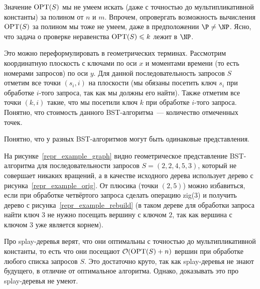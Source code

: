 Значение $\operatorname{OPT}(S)$ мы не умеем искать (даже с точностью до мультипликативной константы) за полином от $n$ и $m$.
Впрочем, опровергать возможность вычисления $\operatorname{OPT}(S)$
за полином мы тоже не умеем, даже в предположении $\P \neq \NP$. Ясно,
что задача о проверке неравенства $\operatorname{OPT}(S) \leqslant k$ лежит в $\NP$.

Это можно переформулировать в геометрических терминах. Рассмотрим координатную
плоскость с ключами по оси $x$ и моментами времени (то есть номерами запросов) по
оси $y$. Для данной последовательность запросов $S$ отметим все точки $(s_i, i)$
на плоскости (мы обязаны посетить ключ $s_i$ при обработке $i$-того
запроса, так как мы должны его найти). Также отметим все точки $(k, i)$ такие,
что мы посетили ключ $k$ при обработке $i$-того запроса. Понятно, что стоимость данного BST-алгоритма~--- количество отмеченных точек.


\begin{remark}
	Понятно, что у разных BST-алгоритмов могут быть одинаковые представления.
\end{remark}




На рисунке~\ref{repr_example_graph} видно геометрическое представление BST-алгоритма для последовательности запросов $S = (2, 2, 4, 5, 3)$, который не совершает никаких вращений, а в качестве исходного дерева использует дерево с рисунка~\ref{repr_example_orig}. От плюсика (точки $(2, 5)$) можно избавиться, если
при обработке четвёртого запроса сделать операцию \textrm{zig(3)} и получить дерево с рисунка~\ref{repr_example_rebuild} (в таком дереве для обработки запроса \textrm{найти ключ 3} не нужно посещать вершину с ключом $2$, так как вершина с ключом $3$ уже является корнем).

Про splay-деревья верят, что они оптимальны с точностью до мультипликативной константы,
то есть что они посещают $\mathcal{O}(\operatorname{OPT}(S) + n)$ вершин при обработке любого списка запросов $S$. Это достаточно круто, так как splay-деревья не знают будущего,
в отличие от оптимальное алгоритма. Однако, доказывать это про splay-деревья не умеют.


